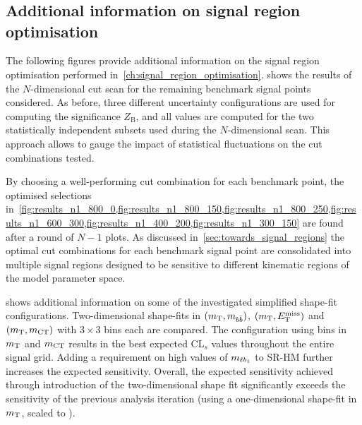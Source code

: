 
\chapter{}

\ifpdf
\graphicspath{{chapter-optimisation/Figs/Raster/}{chapter-electroweak/Figs/PDF/}{chapter-optimisation/Figs/}}
\else
\graphicspath{{chapter-optimisation/Figs/Vector/}{chapter-electroweak/Figs/}}
\fi


\section{Additional information on signal region optimisation}\label{app:n-1_plots_cut_opt}

The following figures provide additional information on the signal region optimisation performed in~\cref{ch:signal_region_optimisation}.  shows the results of the $N$-dimensional cut scan for the remaining benchmark signal points considered. As before, three different uncertainty configurations are used for computing the significance $Z_\mathrm{B}$, and all values are computed for the two statistically independent subsets used during the $N$-dimensional scan. This approach allows to gauge the impact of statistical fluctuations on the cut combinations tested.

By choosing a well-performing cut combination for each benchmark point, the optimised selections in~\cref{fig:results_n1_800_0,fig:results_n1_800_150,fig:results_n1_800_250,fig:results_n1_600_300,fig:results_n1_400_200,fig:results_n1_300_150} are found after a round of $N-1$ plots. As discussed in~\cref{sec:towards_signal_regions} the optimal cut combinations for each benchmark signal point are consolidated into multiple signal regions designed to be sensitive to different kinematic regions of the model parameter space. 

 shows additional information on some of the investigated simplified shape-fit configurations. Two-dimensional shape-fits in $(m_{\textrm{T}},m_{b\bar{b}})$, $(m_{\textrm{T}},E_{\textrm{T}}^{\textrm{miss}})$ and $(m_{\textrm{T}},m_{\textrm{CT}})$ with $3\times 3$ bins each are compared. The configuration using bins in $m_{\textrm{T}}$ and $m_{\textrm{CT}}$ results in the best expected CL$_s$ values throughout the entire signal grid. Adding a requirement on high values of $m_{\ell b_{1}}$ to SR-HM further increases the expected sensitivity. Overall, the expected sensitivity achieved through introduction of the two-dimensional shape fit significantly exceeds the sensitivity of the previous analysis iteration (using a one-dimensional shape-fit in $m_{\textrm{T}}$, scaled to \onethirtynineifb).

